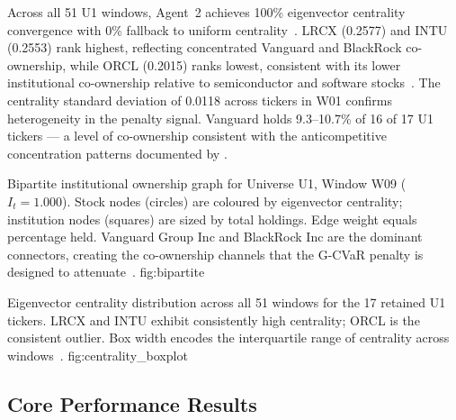 Across all 51 U1 windows, Agent~2 achieves 100\% eigenvector centrality
convergence with 0\% fallback to uniform centrality~\citep{bonacich1987}.
LRCX (0.2577) and INTU (0.2553) rank highest, reflecting concentrated
Vanguard and BlackRock co-ownership, while ORCL (0.2015) ranks lowest,
consistent with its lower institutional co-ownership relative to
semiconductor and software stocks~\citep{azar2018,bebchuk2017}. The
centrality standard deviation of 0.0118 across tickers in W01 confirms
heterogeneity in the penalty signal. Vanguard holds 9.3--10.7\% of 16 of
17 U1 tickers — a level of co-ownership consistent with the anticompetitive
concentration patterns documented by \citet{azar2018}.

  {Bipartite institutional ownership graph for Universe U1, Window W09
   ($I_t = 1.000$). Stock nodes (circles) are coloured by eigenvector
   centrality; institution nodes (squares) are sized by total holdings.
   Edge weight equals percentage held. Vanguard Group Inc and BlackRock
   Inc are the dominant connectors, creating the co-ownership channels
   that the G-CVaR penalty is designed to
   attenuate~\citep{azar2018,billio2012}.}
  {fig:bipartite}

  {Eigenvector centrality distribution across all 51 windows for the
   17 retained U1 tickers. LRCX and INTU exhibit consistently high
   centrality; ORCL is the consistent outlier. Box width encodes the
   interquartile range of centrality across windows~\citep{bonacich1987}.}
  {fig:centrality_boxplot}

\subsection{Core Performance Results}

\begin{table}[H]
\centering
\caption{Performance comparison, Universe U1 (Table~9). Primary
         economic claim: CVaR@95\% reduction vs Equal Weight, not the
         Sharpe comparison vs Standard CVaR~\citep{rockafellar2000}.
         Equal Weight raw-return advantage reflects higher volatility
         (24.4\% vs 19.1\%).}
\label{tab:perf_u1}
\end{table}

